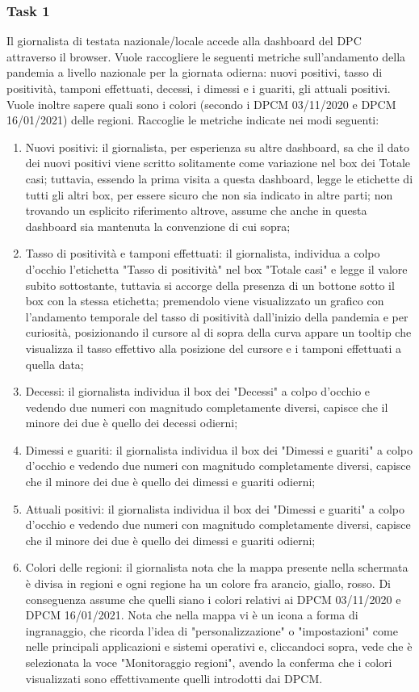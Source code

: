 \subsubsection{Task 1}
\label{sss:cw-task-1}
Il giornalista di testata nazionale/locale accede alla dashboard del DPC attraverso il browser.
Vuole raccogliere le seguenti metriche sull'andamento della pandemia a livello nazionale per la giornata odierna: nuovi positivi, tasso di positività, tamponi effettuati, decessi, i dimessi e i guariti, gli attuali positivi.
Vuole inoltre sapere quali sono i colori (secondo i DPCM 03/11/2020 e DPCM 16/01/2021) delle regioni.
Raccoglie le metriche indicate nei modi seguenti:
\begin{enumerate}[label=\alph*.]
    \item Nuovi positivi: il giornalista, per esperienza su altre dashboard, sa che il dato dei nuovi positivi viene scritto solitamente come variazione nel box dei Totale casi; tuttavia, essendo la prima visita a questa dashboard, legge le etichette di tutti gli altri box, per essere sicuro che non sia indicato in altre parti; non trovando un esplicito riferimento altrove, assume che anche in questa dashboard sia mantenuta la convenzione di cui sopra;
    \item Tasso di positività e tamponi effettuati: il giornalista, individua a colpo d'occhio l'etichetta "Tasso di positività" nel box "Totale casi" e legge il valore subito sottostante, tuttavia si accorge della presenza di un bottone sotto il box con la stessa etichetta; premendolo viene visualizzato un grafico con l'andamento temporale del tasso di positività dall'inizio della pandemia e per curiosità, posizionando il cursore al di sopra della curva appare un tooltip che visualizza il tasso effettivo alla posizione del cursore e i tamponi effettuati a quella data;
    \item Decessi: il giornalista individua il box dei "Decessi" a colpo d'occhio e vedendo due numeri con magnitudo completamente diversi, capisce che il minore dei due è quello dei decessi odierni;
    \item Dimessi e guariti: il giornalista individua il box dei "Dimessi e guariti" a colpo d'occhio e vedendo due numeri con magnitudo completamente diversi, capisce che il minore dei due è quello dei dimessi e guariti odierni;
    \item Attuali positivi: il giornalista individua il box dei "Dimessi e guariti" a colpo d'occhio e vedendo due numeri con magnitudo completamente diversi, capisce che il minore dei due è quello dei dimessi e guariti odierni;
    \item Colori delle regioni: il giornalista nota che la mappa presente nella schermata è divisa in regioni e ogni regione ha un colore fra arancio, giallo, rosso. Di conseguenza assume che quelli siano i colori relativi ai DPCM 03/11/2020 e DPCM 16/01/2021. Nota che nella mappa vi è un icona a forma di ingranaggio, che ricorda l'idea di "personalizzazione" o "impostazioni" come nelle principali applicazioni e sistemi operativi e, cliccandoci sopra, vede che è selezionata la voce "Monitoraggio regioni", avendo la conferma che i colori visualizzati sono effettivamente quelli introdotti dai DPCM.
\end{enumerate}
